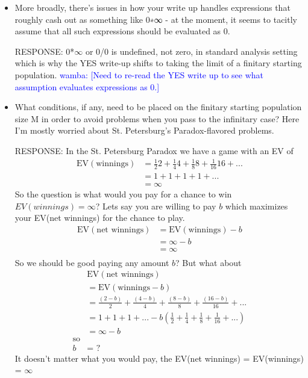 \documentclass[article,twocolumn]{memoir}
\newcommand{\wamba} [1]{\ifnum\Chatty=1 \textcolor{blue}{wamba:  [#1]} \fi}
\begin{document}
\begin{itemize}
\item More broadly, there’s issues in how your write up handles expressions that roughly cash out as something like 0∗∞ - at the moment, it seems to tacitly assume that all such expressions should be evaluated as 0.
    
    {\color{red}
        RESPONSE: 
        0*$\infty$ or 0/0 is undefined, not zero, in standard analysis setting which is why the YES write-up shifts to taking the limit of a finitary starting population.
    }
    \wamba{Need to re-read the YES write up to see what assumption evaluates expressions as 0.}
\item What conditions, if any, need to be placed on the finitary starting population size M in order to avoid problems when you pass to the infinitary case? Here I’m mostly worried about St. Petersburg’s Paradox-flavored problems.

   {\color{red}
        RESPONSE: 
        In the St. Petersburg Paradox we have a game with an EV of
        \begin{align*}
            \text{EV}(\text{winnings})&=\frac{1}{2}2 + \frac{1}{4}4 + \frac{1}{8}8 + \frac{1}{16}16 + ...\\
            &=1 + 1 + 1 + 1 + ...\\
            &=\infty
        \end{align*}
        So the question is what would you pay for a chance to win $EV(winnings)=\infty$?  Lets say you are willing to pay $b$ which maximizes your EV(net winnings) for the chance to play.
        \begin{align*}
            \text{EV}(\text{net winnings})&=\text{EV}(\text{winnings})-b\\ 
             &=\infty-b \\
             &= \infty\\
        \end{align*}
        So we should be good paying any amount $b$? But what about
        \begin{align*}
             &\text{EV}(\text{net winnings})\\
             &=\text{EV}(\text{winnings}-b)\\ 
            & =\frac{(2-b)}{2} + \frac{(4-b)}{4} + \frac{(8-b)}{8} + \frac{(16-b)}{16} + ...\\
            & =1 + 1 + 1 + ... -b(\frac{1}{2}+\frac{1}{4}+\frac{1}{8}+\frac{1}{16}+...)\\
            & =\infty-b\\
            \text{so}\\
           b & = \text{  ?  }
        \end{align*}
        It doesn't matter what you would pay, the EV(net winnings) = EV(winnings) = $\infty$

}
\end{itemize}
\end{document}
